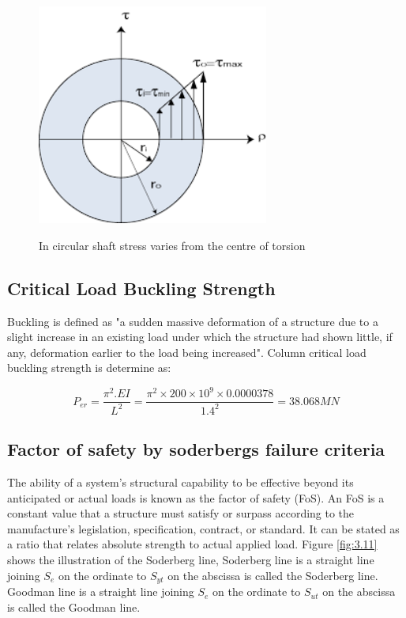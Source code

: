{\begin{figure}[htp]
    \centering
    \includegraphics[width=3in]{Figures/Hallow_shaft.png}
    \caption{In circular shaft stress varies from the centre of torsion}
    \cite{bhandari2011explanatory}
    \label{fig:3.10}
\end{figure}



\subsection{Critical Load Buckling Strength }
Buckling is defined as "a sudden massive deformation of a structure due to a slight increase in an existing load under which the structure had shown little, if any, deformation earlier to the load being increased".  Column critical load buckling strength is determine as:

\begin{equation}
     P_{er} = \frac{\pi^2 .EI}{L^2} = \frac{\pi^2 \times 200 \times10^9 \times  0.0000378}{1.4^2} = 38.068MN
\end{equation}




\subsection{ Factor of safety  by soderbergs failure criteria }
The ability of a system's structural capability to be effective beyond its anticipated or actual loads is known as the factor of safety (FoS). An FoS is a constant value that a structure must satisfy or surpass according to the manufacture's legislation, specification, contract, or standard. It can be stated as a ratio that relates absolute strength to actual applied load.
Figure \ref{fig:3.11} shows the illustration of the Soderberg line, Soderberg line is a straight line joining \(S_e\) on the ordinate to \(S_{yt}\) on the abscissa is called the Soderberg line.  Goodman line is a straight line joining \(S_e\) on the ordinate to \(S_{ut}\) on the abscissa is called the Goodman line.

}
